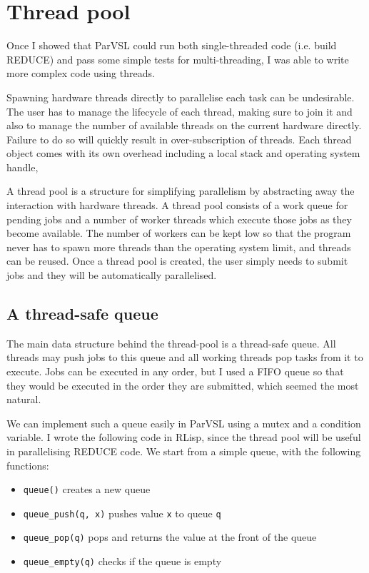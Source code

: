 \section{Thread pool}

Once I showed  that ParVSL could run both single-threaded code (i.e. build REDUCE) and pass some
simple tests for multi-threading, I was able to write more complex code using threads.

Spawning hardware threads directly to parallelise each task can be undesirable. The user has
to manage the lifecycle of each thread, making sure to join it and also to manage the number
of available threads on the current hardware directly. Failure to do so will quickly result in
over-subscription of threads. Each thread object comes with its own overhead including a local
stack and operating system handle,

A thread pool is a structure for simplifying parallelism by abstracting away the interaction
with hardware threads. A thread pool consists of a work queue for pending jobs and a number
of worker threads which execute those jobs as they become available. The number of workers
can be kept low so that the program never has to spawn more threads
than the operating system limit, and threads can be reused. Once a thread pool is created,
the user simply needs to submit jobs and they will be automatically parallelised.

\subsection{A thread-safe queue}

The main data structure behind the thread-pool is a thread-safe queue. All threads may push
jobs to this queue and all working threads pop tasks from it to execute. Jobs can be executed
in any order, but I used a FIFO queue so that they would be executed in the order they are submitted,
which seemed the most natural.

We can implement such a queue easily in ParVSL using a mutex and a condition variable.
I wrote the following code in RLisp, since the thread pool will be useful in parallelising
REDUCE code.
We start from a simple queue, with the following functions:

\begin{itemize}
\item \texttt{queue()} creates a new queue
\item \texttt{queue\_push(q, x)} pushes value \texttt{x} to queue \texttt{q}
\item \texttt{queue\_pop(q)} pops and returns the value at the front of the queue
\item \texttt{queue\_empty(q)} checks if the queue is empty
\end{itemize}


